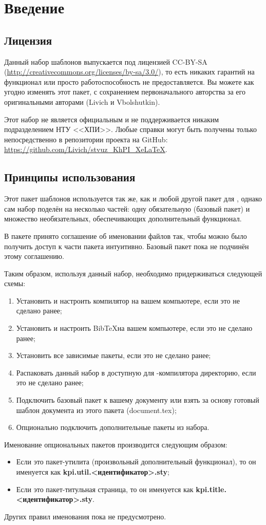 \section{Введение}
\subsection{Лицензия}
	Данный набор шаблонов выпускается под лицензией CC-BY-SA
	(\url{http://creativecommons.org/licenses/by-sa/3.0/}), то есть никаких
	гарантий на функционал или просто работоспособность не предоставляется. Вы
	можете как угодно изменять этот пакет, с сохранением первоначального авторства
	за его оригинальными авторами (Livich и Vbolshutkin).\par
	Этот набор не является официальным и не поддерживается никаким подразделением
	НТУ <<ХПИ>>. Любые справки могут быть получены только непосредственно в
	репозитории проекта на GitHub:
	\url{https://github.com/Livich/stvuz_KhPI_XeLaTeX}.
\subsection{Принципы использования}
	Этот пакет шаблонов используется так же, как и любой другой пакет для \XeLaTeX,
	однако сам набор поделён на несколько частей: одну обязательную (базовый пакет)
	и множество необязательных, обеспечивающих дополнительный функционал.\par
	В пакете принято соглашение об именовании файлов так, чтобы можно было получить
	доступ к части пакета интуитивно. Базовый пакет пока не подчинён этому
	соглашению.\par
	Таким образом, используя данный набор, необходимо придерживаться следующей
	схемы:
	\begin{enumerate}
	  \item Установить и настроить компилятор \XeLaTeX на вашем компьютере, если
	  это не сделано ранее;
	  \item Установить и настроить Bib\TeX на вашем компьютере, если
	  это не сделано ранее;
	  \item Установить все зависимые пакеты, если
	  это не сделано ранее;
	  \item Распаковать данный набор в доступную для \XeLaTeX-компилятора
	  директорию, если это не сделано ранее;
	  \item Подключить базовый пакет к вашему документу или взять за основу готовый
	  шаблон документа из этого пакета (document.tex);
	  \item Опционально подключить дополнительные пакеты из набора.
	\end{enumerate}
	Именование опциональных пакетов производится следующим образом:
	\begin{itemize}
	  \item Если это пакет-утилита (произвольный дополнительный функционал), то он
	  именуется как {\bf kpi.util.<идентификатор>.sty};
	  \item Если это пакет-титульная страница, то он именуется как {\bf
	  kpi.title.<идентификатор>.sty}.
	\end{itemize}
	Других правил именования пока не предусмотрено.
